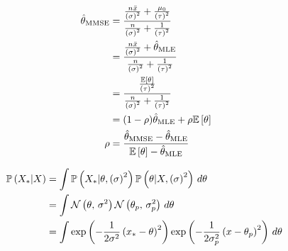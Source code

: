 \documentclass[12pt]{article}
\begin{document}
\begin{enumerate}

\begin{align*}
    \hat{\theta}_{\mathrm{MMSE}} &= \frac{\frac{n\bar{x}}{\left(\sigma\right)^2} + \frac{\mu_0}{\left(\tau\right)^2}}{\frac{n}{\left(\sigma\right)^2} + \frac{1}{\left(\tau\right)^2}} \\
                  &= \frac{\frac{n\bar{x}}{\left(\sigma\right)^2} + \hat{\theta}_{\mathrm{MLE}}}{\frac{n}{\left(\sigma\right)^2} + \frac{1}{\left(\tau\right)^2}} \\
                  &= \frac{\frac{\mathbb{E}\left[\theta\right]}{\left(\tau\right)^2}}{\frac{n}{\left(\sigma\right)^2} + \frac{1}{\left(\tau\right)^2}} \\ 
                  &= (1-\rho)\hat{\theta}_{\mathrm{MLE}} + \rho\mathbb{E}\left[\theta\right] \\
             \rho &= \frac{\hat{\theta}_{\mathrm{MMSE}} - \hat{\theta}_{\mathrm{MLE}}}{\mathbb{E}\left[\theta\right]-\hat{\theta}_{\mathrm{MLE}}}
\end{align*}



\begin{align*}
    \prob{X_*|X} &= \int\prob{X_*|\theta, \squared{\sigma}}\prob{\theta|X, \squared{\sigma}}\,d\theta\ \\ 
                 &= \int\normnot{\theta}{\sigma^2}\normnot{\theta_p}{\sigma^2_p}\,d\theta\ \\
                 &= \int \exp{-\frac{1}{2\sigma^2} \squared{x_*-\theta}} \exp{-\frac{1}{2\sigma^2_p}\squared{x-\theta_p}}\, d\theta\
\end{align*}

\end{enumerate}
\end{document}
